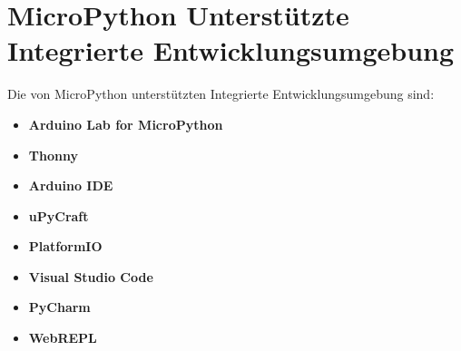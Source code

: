 \section{MicroPython Unterstützte Integrierte Entwicklungsumgebung}
Die von MicroPython unterstützten Integrierte Entwicklungsumgebung sind:
\begin{itemize}
	\item \textbf{Arduino Lab for MicroPython}
	\item \textbf{Thonny}
	\item \textbf{Arduino IDE}
	\item \textbf{uPyCraft}
	\item \textbf{PlatformIO}
	\item \textbf{Visual Studio Code}
	\item \textbf{PyCharm}
	\item \textbf{WebREPL}
	
\end{itemize}

